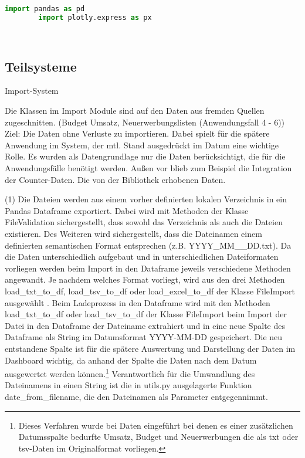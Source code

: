     \begin{lstlisting}[language=Python, caption=Python example]
        import pandas as pd
        import plotly.express as px

        
    \end{lstlisting}

    \subsection{Teilsysteme}
    
    Import-System
    
    Die Klassen im Import Module sind auf den Daten aus fremden Quellen zugeschnitten.
    (Budget Umsatz, Neuerwerbungslisten (Anwendungsfall 4 - 6))
    Ziel: Die Daten ohne Verluste zu importieren. Dabei spielt für die spätere Anwendung im System, der mtl. Stand
    ausgedrückt im Datum eine wichtige Rolle.
    Es wurden als Datengrundlage nur die Daten berücksichtigt, die für die Anwendungsfälle benötigt werden.
    Außen vor blieb zum Beispiel die Integration der Counter-Daten.
    Die von der Bibliothek erhobenen Daten.
    
    
    (1) Die Dateien werden aus einem vorher definierten lokalen Verzeichnis in ein Pandas Dataframe exportiert. Dabei wird mit Methoden
    der Klasse FileValidation sichergestellt, dass sowohl das Verzeichnis als auch die Dateien existieren. Des Weiteren wird sichergestellt,
    dass die Dateinamen einem definierten semantischen Format entsprechen (z.B. YYYY_MM__DD.txt). 
    Da die Daten unterschiedlich aufgebaut und in unterschiedlichen Dateiformaten vorliegen werden beim Import in den Dataframe jeweils verschiedene Methoden angewandt. Je
    nachdem welches Format vorliegt, wird aus den drei Methoden load_txt_to_df, load_tsv_to_df oder load_excel_to_df der Klasse FileImport ausgewählt .
    Beim Ladeprozess in den Dataframe wird mit den Methoden load_txt_to_df oder load_tsv_to_df der Klasse FileImport beim Import der Datei in den Dataframe der Dateiname
    extrahiert und in eine neue Spalte des Dataframe als String im Datumsformat YYYY-MM-DD gespeichert. Die neu entstandene Spalte ist für die spätere Auswertung und
    Darstellung der Daten im Dashboard wichtig, da anhand der Spalte die Daten nach dem Datum ausgewertet werden können.\footnote{Dieses Verfahren wurde bei Daten eingeführt
    bei denen es einer zusätzlichen Datumsspalte bedurfte Umsatz,
    Budget und Neuerwerbungen die als txt oder tsv-Daten im Originalformat vorliegen.} Verantwortlich für die Umwandlung des Dateinamens in einen String ist die in utils.py
    ausgelagerte Funktion date_from_filename, die den Dateinamen als Parameter entgegennimmt. 
    
